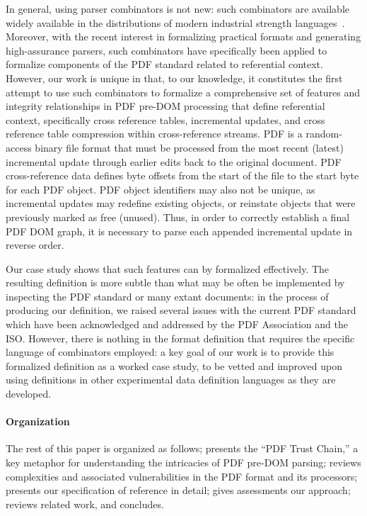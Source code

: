 In general, using parser combinators is not new: such combinators are
available widely available in the distributions of modern industrial
strength languages~\cite{leijen2001parsec,couprie2015nom,mundkurResearchReportParsley2020,bratus2017curing,willis2020staged}.
%
Moreover, with the recent interest in formalizing practical formats
and generating high-assurance parsers, such combinators have
specifically been applied to formalize components of the
PDF standard related to referential context.
%
However, our work is unique in that, to our knowledge, it constitutes
the first attempt to use such combinators to formalize a comprehensive
set of features and integrity relationships in PDF pre-DOM processing
that define referential context, specifically cross reference tables,
incremental updates, and cross reference table compression within
cross-reference streams. PDF is a random-access binary file format
that must be processed from the most recent (latest) incremental
update through earlier edits back to the original document.
%
PDF cross-reference data defines byte offsets from the start of the
file to the start byte for each PDF object. PDF object identifiers may
also not be unique, as incremental updates may redefine existing
objects, or reinstate objects that were previously marked as free
(unused).
%
Thus, in order to correctly establish a final PDF DOM graph, it is
necessary to parse each appended incremental update in reverse
order.

Our case study shows that such features can by formalized effectively.
%
The resulting definition is more subtle than what may be often be
implemented by inspecting the PDF standard or many extant documents:
in the process of producing our definition, we raised several issues
with the current PDF standard which have been acknowledged and
addressed by the PDF Association and the ISO.
%
However, there is nothing in the format definition that requires the
specific language of combinators employed: a key goal of our work is
to provide this formalized definition as a worked case study, to be
vetted and improved upon using definitions in other experimental data
definition languages as they are developed.


\paragraph*{Organization} The rest of this paper is organized as
follows;
%
 presents the ``PDF Trust Chain,'' a key metaphor
for understanding the intricacies of PDF pre-DOM parsing;
%
 reviews complexities and associated vulnerabilities in
the PDF format and its processors;
%
 presents our specification of reference in
detail;
%
 gives assessments our approach;
%
 reviews related work, and %
 concludes.

